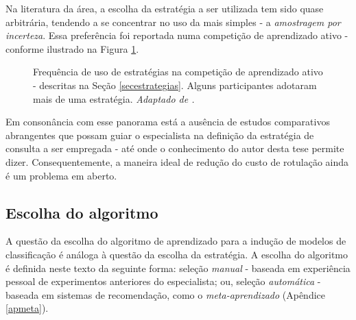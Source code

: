 Na literatura da área, a escolha da estratégia a ser utilizada tem sido quase arbitrária, tendendo a se concentrar no uso da mais simples - a \textit{amostragem por incerteza}.
Essa preferência foi reportada numa competição de aprendizado ativo \cite{journals/jmlr/GuyonCDL11} - conforme ilustrado na Figura \ref{compet}.
\begin{figure}
	\centering
	
	\caption[Frequência de uso de estratégias na competição de aprendizado ativo.]{Frequência de uso de estratégias na competição de aprendizado ativo - descritas na Seção \ref{secestrategias}.
	Alguns participantes adotaram mais de uma estratégia.
	\textit{Adaptado de .}}
	\label{compet}
\end{figure}
Em consonância com esse panorama está a ausência de estudos comparativos abrangentes que possam guiar o especialista na definição da estratégia de consulta a ser empregada - até onde o conhecimento do autor desta tese permite dizer.
Consequentemente, a maneira ideal de redução do custo de rotulação ainda é um problema em aberto.

\subsection{Escolha do algoritmo}\label{ea}
A questão da escolha do algoritmo de aprendizado para a indução de modelos de classificação é análoga à questão da escolha da estratégia.
A escolha do algoritmo é definida neste texto da seguinte forma: seleção \textit{manual} - baseada em experiência pessoal de experimentos anteriores do especialista; ou, seleção \textit{automática} - baseada em sistemas de recomendação, como o \textit{meta-aprendizado} (Apêndice \ref{apmeta}).

